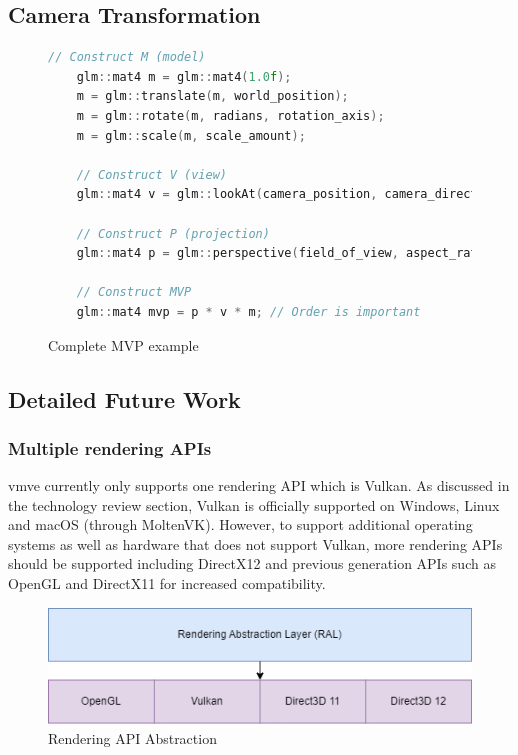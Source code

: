 \documentclass[11pt]{article}
\begin{document}
\subsection{Camera Transformation}
\begin{figure}[H]
  \centering
  \begin{lstlisting}[language=C++]
    // Construct M (model)
    glm::mat4 m = glm::mat4(1.0f);
    m = glm::translate(m, world_position);   
    m = glm::rotate(m, radians, rotation_axis); 
    m = glm::scale(m, scale_amount);

    // Construct V (view)
    glm::mat4 v = glm::lookAt(camera_position, camera_direction, camera_up);

    // Construct P (projection)
    glm::mat4 p = glm::perspective(field_of_view, aspect_ratio, near, far);

    // Construct MVP
    glm::mat4 mvp = p * v * m; // Order is important

  \end{lstlisting}
  \caption{Complete MVP example}
  \label{fig:local_to_world_appendix}
\end{figure}

\subsection{Detailed Future Work} \label{detailed_future_work}

\subsubsection{Multiple rendering APIs}
\gls*{vmve} currently only supports one rendering API which is Vulkan. As
discussed in the technology review section, Vulkan is officially supported on
Windows, Linux and macOS (through MoltenVK). However, to support additional
operating systems as well as hardware that does not support Vulkan, more
rendering APIs should be supported including DirectX12 and previous generation
APIs such as OpenGL and DirectX11 for increased compatibility.

\begin{figure}[H]
  \centering
  \includegraphics[width=\textwidth]{images/api_abstraction.png}
  \caption{Rendering API Abstraction}
  \label{fig:api_abstraction}
\end{figure}
\end{document}
